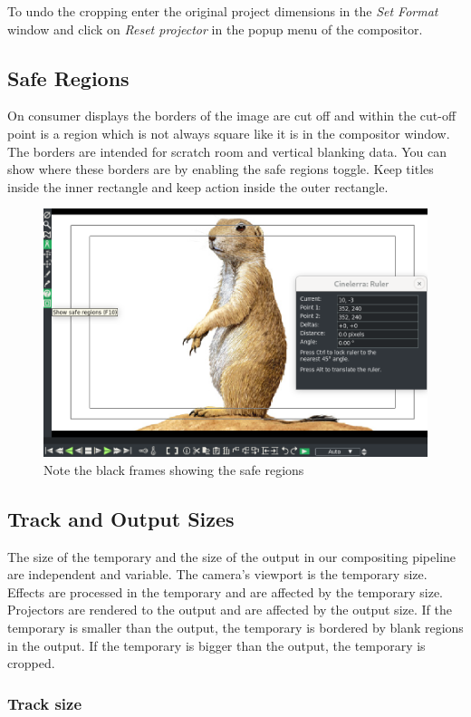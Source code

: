 To undo the cropping enter the original project dimensions in the \textit{Set Format} window and click on \textit{Reset projector} in the popup menu of the compositor.

\subsection{Safe Regions}%
\label{sub:safe_regions}

On consumer displays the borders of the image are cut off and within the cut-off point is a region which is not always square like it is in the compositor window. 
The borders are intended for scratch room and vertical blanking data. 
You can show where these borders are by enabling the safe regions toggle. 
Keep titles inside the inner rectangle and keep action inside the outer rectangle.

\begin{figure}[htpb]
    \centering
    \includegraphics[width=0.5\linewidth]{images/safe_regions.png}
    \caption{Note the black frames showing the safe regions}
    \label{fig:safe_regions}
\end{figure}

\subsection{Track and Output Sizes}%
\label{sub:track_and_output_sizes}


The size of the temporary and the size of the output in our compositing pipeline are independent and variable. 
The camera's viewport is the temporary size. 
Effects are processed in the temporary and are affected by the temporary size. 
Projectors are rendered to the output and are affected by the output size. 
If the temporary is smaller than the output, the temporary is bordered by blank regions in the output. 
If the temporary is bigger than the output, the temporary is cropped.

\subsubsection*{Track size}%
\label{ssub:track_size}

